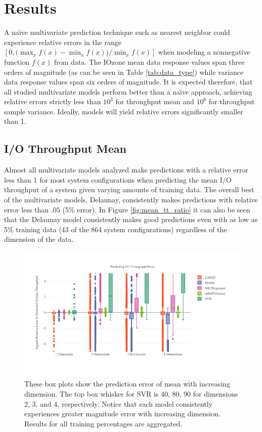 \documentclass{scspaperproc}
\theoremstyle{scsthe}
\begin{document}
\section{Results}
\label{sec:results}

A na\"{\i}ve multivariate prediction technique such as nearest
neighbor could experience relative errors in the range $\displaystyle
[0, \big(\max_x f(x) - \min_x f(x)\big) / \min_x f(x) ]$ when modeling
a nonnegative function $f(x)$ from data. The IOzone mean data response
values span three orders of magnitude (as can be seen in Table
\ref{tab:data_type}) while variance data response values span six
orders of magnitude. It is expected therefore, that all studied
multivariate models perform better than a na\"{\i}ve approach,
achieving relative errors strictly less than $10^3$ for throughput
mean and $10^6$ for throughput sample variance. Ideally, models will
yield relative errors significantly smaller than 1.

\vspace{-10pt}
\subsection{I/O Throughput Mean}
\vspace{-10pt}
Almost all multivariate models analyzed make predictions with a
relative error less than 1 for most system configurations when
predicting the mean I/O throughput of a system given varying amounts
of training data. The overall best of the multivariate models,
Delaunay, consistently makes predictions with relative error less than
$.05$ (5\% error). In Figure \ref{fig:mean_tt_ratio} it can also be
seen that the Delaunay model consistently makes good predictions even
with as low as 5\% training data (43 of the 864 system configurations)
regardless of the dimension of the data.

\begin{figure}
  \centering
  \includegraphics[width=\textwidth,trim={0 .5in 0 .3in}]{Mean_Dim.pdf}
  \caption{These box plots show the prediction error of mean with
    increasing dimension. The top box whisker for SVR is 40, 80, 90
    for dimensions 2, 3, and 4, respectively. Notice that each model
    consistently experiences greater magnitude error with increasing
    dimension. Results for all training percentages are aggregated.}
  \label{fig:mean_dim}
\end{figure}
\end{document}
